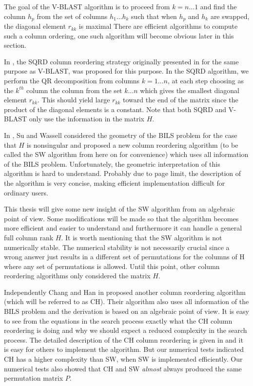 \documentclass[12pt,Bold,letterpaper]{mcgilletdclass}
\begin{document}
The goal of the V-BLAST algorithm is to proceed from $k=n \dots 1$ and find the column $h_p$ from the set of columns $h_1 \dots h_k$ such that when $h_p$ and $h_k$ are swapped, the diagonal element $r_{kk}$ is maximal There are efficient algorithms to compute such a column ordering, one such algorithm will become obvious later in this section.

In \cite{ChaH05}, the SQRD column reordering strategy originally presented in \cite{WubBRKK01} for the same purpose as V-BLAST, was proposed for this purpose. In the SQRD algorithm, we perform the QR decomposition from columns $k = 1 \dots n$, at each step choosing as the $k^{th}$ column the column from the set $k \dots n$ which gives the smallest diagonal element $r_{kk}$. This should yield large $r_{kk}$ toward the end of the matrix since the product of the diagonal elements is a constant. Note that both SQRD and V-BLAST only use the information in the matrix $H$.

In \cite{SuW05}, Su and Wassell considered the geometry of the BILS
problem for the case that $H$ is nonsingular and proposed a new column reordering algorithm (to be called
the SW algorithm from here on for convenience) which uses all information of the BILS problem.
Unfortunately, the geometric interpretation of this algorithm is hard to understand.
Probably due to page limit, the description of the algorithm is very concise, 
making efficient implementation difficult for ordinary users.

This thesis will give some new insight of the SW algorithm from an algebraic point of view.
Some modifications will be made so that the algorithm becomes more efficient
and easier to understand and furthermore it can handle a general full column rank $H$.
It is worth mentioning that the SW algorithm is not numerically stable. The numerical stability is not
necessarily crucial since a wrong answer just results in a different set of
permutations for the columns of H where any set of permutations is allowed.
Until this point, other column reordering algorithms only considered the matrix $H$.

Independently  Chang and Han in \cite{ChaH05} proposed
another column reordering algorithm (which will be referred to as  CH).
Their algorithm also uses all information of the BILS problem and the derivation
is based on an algebraic point of view. It is  easy to see from the equations in
the search process exactly what the CH column reordering is doing and why we
should expect a reduced complexity in the search process. The detailed
description of the CH column reordering is given in \cite{ChaH05} and it is easy
for others to implement the algorithm.
But our numerical tests indicated CH has a  higher complexity than SW, when SW
is implemented efficiently.
Our numerical tests also showed that CH and SW {\em almost} always   
produced the same permutation matrix $P$.
\end{document}

